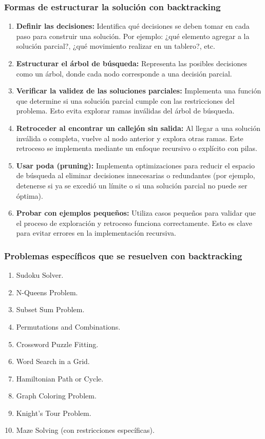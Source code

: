 \subsubsection{Formas de estructurar la solución con backtracking}  

\begin{enumerate}  
  \item \textbf{Definir las decisiones:} Identifica qué decisiones se deben tomar en cada paso para construir una solución. Por ejemplo: ¿qué elemento agregar a la solución parcial?, ¿qué movimiento realizar en un tablero?, etc.  
  \item \textbf{Estructurar el árbol de búsqueda:} Representa las posibles decisiones como un árbol, donde cada nodo corresponde a una decisión parcial.  
  \item \textbf{Verificar la validez de las soluciones parciales:} Implementa una función que determine si una solución parcial cumple con las restricciones del problema. Esto evita explorar ramas inválidas del árbol de búsqueda.  
  \item \textbf{Retroceder al encontrar un callejón sin salida:} Al llegar a una solución inválida o completa, vuelve al nodo anterior y explora otras ramas. Este retroceso se implementa mediante un enfoque recursivo o explícito con pilas.  
  \item \textbf{Usar poda (pruning):} Implementa optimizaciones para reducir el espacio de búsqueda al eliminar decisiones innecesarias o redundantes (por ejemplo, detenerse si ya se excedió un límite o si una solución parcial no puede ser óptima).  
  \item \textbf{Probar con ejemplos pequeños:} Utiliza casos pequeños para validar que el proceso de exploración y retroceso funciona correctamente. Esto es clave para evitar errores en la implementación recursiva.  
\end{enumerate}  

\subsubsection{Problemas específicos que se resuelven con backtracking}  

\begin{enumerate}  
  \item Sudoku Solver.  
  \item N-Queens Problem.  
  \item Subset Sum Problem.  
  \item Permutations and Combinations.  
  \item Crossword Puzzle Fitting.  
  \item Word Search in a Grid.  
  \item Hamiltonian Path or Cycle.  
  \item Graph Coloring Problem.  
  \item Knight's Tour Problem.  
  \item Maze Solving (con restricciones específicas).  
\end{enumerate}

